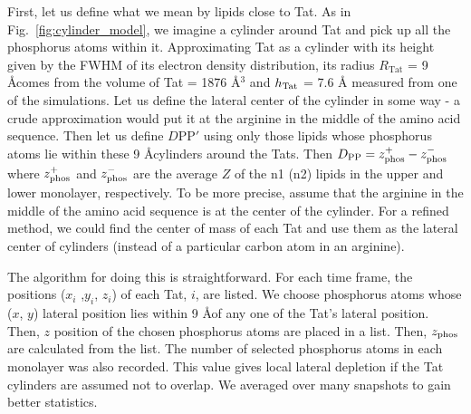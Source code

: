 First, let us define what we mean by lipids close to Tat.  
As in Fig.~\ref{fig:cylinder_model}, we imagine a cylinder around Tat and 
pick up all the phosphorus atoms within it.  
Approximating Tat as a cylinder 
with its height given by the FWHM of its electron density distribution, 
its 
radius $R_\textrm{Tat}$ = 9 \AA comes from the volume of Tat = 1876 \AA$^3$ and 
$h_\mathrm{Tat}$ = 7.6 \AA
measured from one of the simulations. 
Let us define the lateral center of the 
cylinder in some way - a crude approximation would put it at the arginine in 
the middle of the amino acid sequence. Then let us define $D\textrm{PP}'$ 
using only 
those lipids whose phosphorus atoms lie within these 9 \AA cylinders around the 
Tats. Then $D_\textrm{PP} = z_\textrm{phos}^+ - z_\textrm{phos}^-$ where $z_\textrm{phos}^+$ and $z_\textrm{phos}^-$ 
are the 
average $Z$ of the n1 (n2) lipids in the upper and lower monolayer, respectively.  
To be more precise, assume that the arginine in the middle of the amino acid 
sequence is at the center of the cylinder. For a refined method, we could find 
the center of mass of each Tat and use them as the lateral center of cylinders 
(instead of a particular carbon atom in an arginine). 

The algorithm for doing this is straightforward.  For each time frame, 
the positions ($x_i$ ,$y_i$, $z_i$) of each Tat, $i$, are listed.   
We choose phosphorus atoms whose ($x$, $y$) lateral position lies within 
9 \AA of any one of the Tat's lateral position. Then, $z$ position
of the chosen phosphorus atoms are placed in a 
list. Then, $z_\textrm{phos}$ are calculated from the list. 
The number of selected phosphorus atoms in each monolayer was also 
recorded. This value gives local lateral depletion if the Tat cylinders 
are assumed not to overlap. We averaged over many snapshots to gain 
better statistics. 

